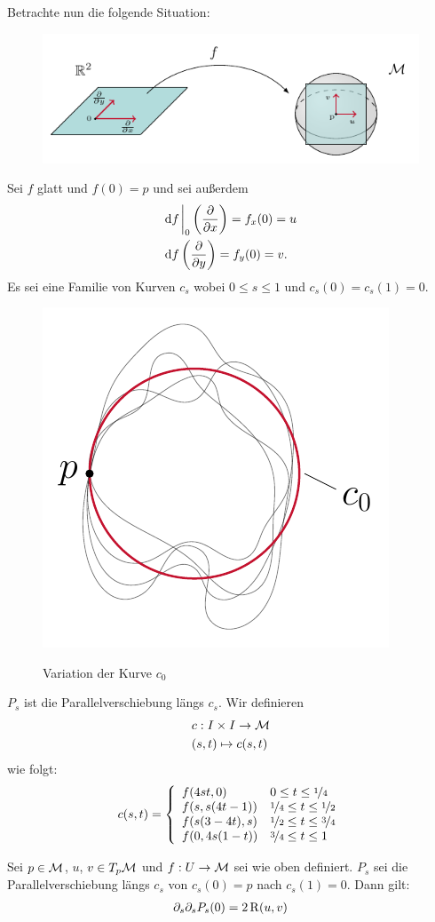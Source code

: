 Betrachte nun die folgende Situation:
\begin{figure}[H]
\centering
\includegraphics[width=1\linewidth]{figures/tikz/coordinates_r2_manifold.pdf}
\label{img:coordinates_r2_manifold}
\end{figure} 


Sei $f$ glatt und $f(0)=p$ und sei außerdem
\begin{align}
& \dd f \eval_0 \left( \pdv{x} \right) = f_x (0) = u\\
& \dd f \left( \pdv{y}\right) = f_y(0) = v.
\end{align}
Es sei eine Familie von Kurven $c_s$ wobei $0 \leq s \leq 1$ und $c_s (0) = c_s(1) = 0$.
\begin{figure}[H]
\centering
\includegraphics[width=0.4\linewidth]{figures/tikz/variantion_of_closed_curve.pdf}
\label{img:variantion_of_closed_curve}
\caption{Variation der Kurve $c_0$}
\end{figure} 

$P_s$ ist die Parallelverschiebung längs $c_s$.
Wir definieren
\begin{align}
&c : I \times I \to \mathcal{M}\\
&(s, t) \mapsto c(s,t)
\end{align}
wie folgt:
\begin{align}
c(s, t) = \left\{
\begin{array}{ll}
f(4 s t, 0) & 0 \leq t \leq \nicefrac{1}{4} \\
f(s, s(4t-1)) & \nicefrac{1}{4} \leq t \leq \nicefrac{1}{2}\\
f(s(3-4t), s) & \nicefrac{1}{2} \leq t \leq \nicefrac{3}{4}\\
f(0, 4s(1-t)) & \nicefrac{3}{4} \leq t \leq 1
\end{array}
\right. 
\end{align}
\begin{satz}
Sei $p \in \mathcal{M}$, $u$, $v \in T_p \mathcal{M}$ und $f: U \to \mathcal{M}$ sei wie oben definiert.
$P_s$ sei die Parallelverschiebung längs $c_s$ von $c_s(0) = p$ nach $c_s(1) = 0$.
Dann gilt:
\begin{align}
\partial_s \partial_s P_s(0) = 2 \operatorname{R} (u, v)
\end{align}
\end{satz}

